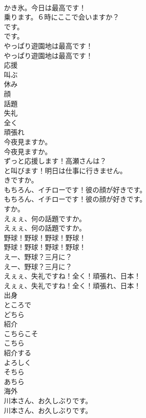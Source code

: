 \documentclass[8pt]{extreport}
\begin{document}
\begin{CJK}{UTF8}{min}
\\	かき氷。今日は最高です！	
\\	乗ります。６時にここで会いますか？	
\\	です。	
\\	です。 
\\	やっぱり遊園地は最高です！	
\\	やっぱり遊園地は最高です！ 
\\	応援
\\	叫ぶ
\\	休み
\\	顔
\\	話題
\\	失礼
\\	全く
\\	頑張れ
\\	今夜見ますか。	
\\	今夜見ますか。 
\\	ずっと応援します！高瀬さんは？	
\\	と叫びます！明日は仕事に行きません。	
\\	きですか。	
\\	もちろん、イチローです！彼の顔が好きです。	
\\	もちろん、イチローです！彼の顔が好きです。 
\\	すか。	
\\	えぇぇ、何の話題ですか。	
\\	えぇぇ、何の話題ですか。 
\\	野球！野球！野球！野球！	
\\	野球！野球！野球！野球！ 
\\	えー、野球？三月に？	
\\	えー、野球？三月に？ 
\\	えぇぇ、失礼ですね！全く！頑張れ、日本！	
\\	えぇぇ、失礼ですね！全く！頑張れ、日本！ 
\\	出身
\\	ところで
\\	どちら
\\	紹介
\\	こちらこそ
\\	こちら
\\	紹介する
\\	よろしく
\\	そちら
\\	あちら
\\	海外
\\	川本さん、お久しぶりです。	
\\	川本さん、お久しぶりです。 

\end{CJK}
\end{document}
